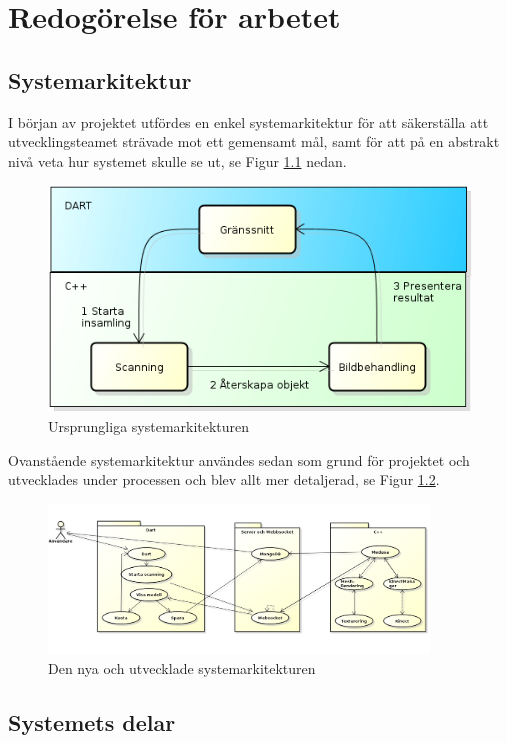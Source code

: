 \documentclass[a4paper,12pt,oneside,final]{extbook}
\begin{document}
\chapter{Redogörelse för arbetet}
\section{Systemarkitektur}
I början av projektet utfördes en enkel systemarkitektur för att säkerställa att utvecklingsteamet strävade mot ett gemensamt mål, samt för att på en abstrakt nivå veta hur systemet skulle se ut, se Figur \ref{fig:oldArch} nedan.

\begin{figure}[ht]
  \centering
  \includegraphics[width=.9\textwidth]{bilder/oldarch.png}
  \caption{Ursprungliga systemarkitekturen}
  \label{fig:oldArch}
\end{figure}

Ovanstående systemarkitektur användes sedan som grund för projektet och utvecklades under processen och blev allt mer detaljerad, se Figur \ref{fig:newArch}.

\begin{figure}[ht]
  \centering
  \includegraphics[width=0.9\textwidth]{bilder/newarch.png}
  \caption{Den nya och utvecklade systemarkitekturen}
  \label{fig:newArch}
\end{figure}

\section{Systemets delar}
\end{document}
